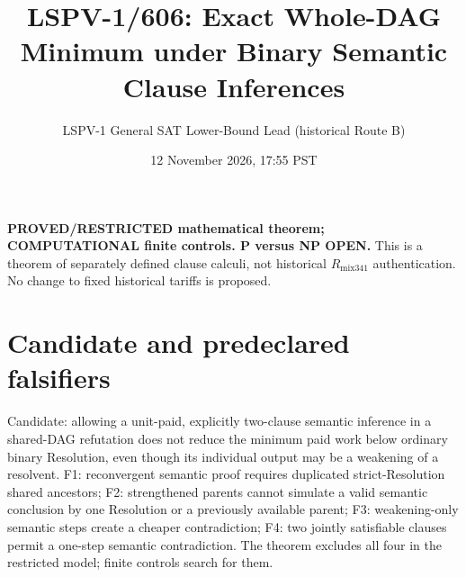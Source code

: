 \documentclass[11pt]{article}
\title{LSPV-1/606: Exact Whole-DAG Minimum under Binary Semantic Clause Inferences}
\author{LSPV-1 General SAT Lower-Bound Lead (historical Route B)}
\date{12 November 2026, 17:55 PST}
\begin{document}
\maketitle
\noindent\textbf{PROVED/RESTRICTED mathematical theorem; COMPUTATIONAL finite controls. P versus NP OPEN.}
This is a theorem of separately defined clause calculi, not historical $R_{\mathrm{mix341}}$ authentication. No change to fixed historical tariffs is proposed.
\section*{Candidate and predeclared falsifiers}
Candidate: allowing a unit-paid, explicitly two-clause semantic inference in a shared-DAG refutation does not reduce the minimum paid work below ordinary binary Resolution, even though its individual output may be a weakening of a resolvent.
F1: reconvergent semantic proof requires duplicated strict-Resolution shared ancestors; F2: strengthened parents cannot simulate a valid semantic conclusion by one Resolution or a previously available parent; F3: weakening-only semantic steps create a cheaper contradiction; F4: two jointly satisfiable clauses permit a one-step semantic contradiction. The theorem excludes all four in the restricted model; finite controls search for them.
\end{document}
